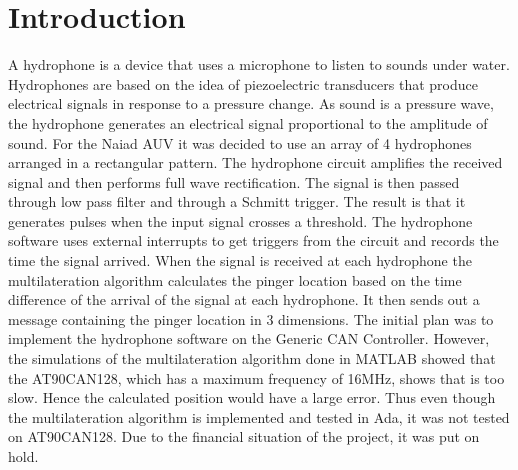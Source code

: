 \section{Introduction}\label{sec:introduction}
A hydrophone is a device that uses a microphone to listen to sounds under water. Hydrophones are based on the idea of piezoelectric transducers that produce electrical signals in response to a pressure change. As sound is a pressure wave, the hydrophone generates an electrical signal proportional to the amplitude of sound.\newline
For the Naiad AUV it was decided to use an array of 4 hydrophones arranged in a rectangular pattern. 
The hydrophone circuit amplifies the received signal and then performs full wave rectification. The signal is then passed through low pass filter and through a Schmitt trigger. The result is that it generates pulses when the input signal crosses a threshold. \newline
The hydrophone software uses external interrupts to get triggers from the circuit and records the time the signal arrived. When the signal is received at each hydrophone the multilateration algorithm calculates the pinger location based on the time difference of the arrival of the signal at each hydrophone. It then sends out a message containing the pinger location in 3 dimensions.\newline
The initial plan was to implement the hydrophone software on the Generic CAN Controller. However, the simulations of the multilateration algorithm done in MATLAB showed that the AT90CAN128, which has a maximum frequency of 16MHz, shows that is too slow. Hence the calculated position would have a large  error. Thus even though the multilateration algorithm is implemented and tested in Ada, it was not tested on AT90CAN128. Due to the financial situation of the project, it was put on hold.
  

